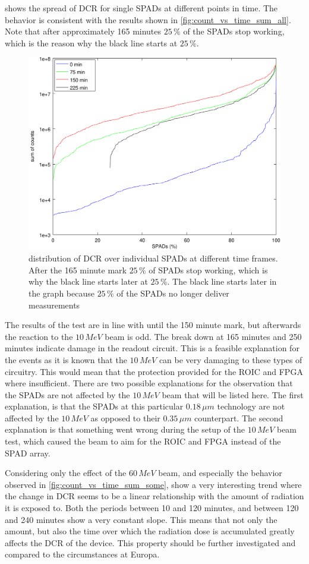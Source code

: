  shows the spread of DCR for single SPADs at different points in time. The behavior is consistent with the results shown in \cref{fig:count_vs_time_sum_all}. Note that after approximately 165 minutes $25\,\%$ of the SPADs stop working, which is the reason why the black line starts at $25\,\%$.

\begin{figure}[h]
\centering
	\includegraphics[width=0.6\linewidth]{fig/sigmoid_sweep.pdf}
\caption{distribution of DCR over individual SPADs at different time frames. After the 165 minute mark $25\,\%$ of SPADs stop working, which is why the black line starts later at $25\,\%$. The black line starts later in the graph because $25\,\%$ of the SPADs no longer deliver measurements}
\label{fig:sigmoid_sweep}
\end{figure}


The results of the test are in line with until the 150 minute mark, but afterwards the reaction to the $10\,MeV$ beam is odd. The break down at 165 minutes and 250 minutes indicate damage in the readout circuit. This is a feasible explanation for the events as it is known that the $10\,MeV$ can be very damaging to these types of circuitry. This would mean that the protection provided for the ROIC and FPGA where insufficient. There are two possible explanations for the observation that the SPADs are not affected by the $10\,MeV$ beam that will be listed here. The first explanation, is that the SPADs at this particular $0.18\,\mu m$ technology are not affected by the $10\,MeV$ as opposed to their $0.35\,\mu m$ counterpart. The second explanation is that something went wrong during the setup of the $10\,MeV$ beam test, which caused the beam to aim for the ROIC and FPGA instead of the SPAD array. 

Considering only the effect of the $60\,MeV$ beam, and especially the behavior observed in \cref{fig:count_vs_time_sum_some}, show a very interesting trend where the change in DCR seems to be a linear relationship with the amount of radiation it is exposed to. Both the periods between 10 and 120 minutes, and between 120 and 240 minutes show a very constant slope. This means that not only the amount, but also the time over which the radiation dose is accumulated greatly affects the DCR of the device. This property should be further investigated and compared to the circumstances at Europa.
